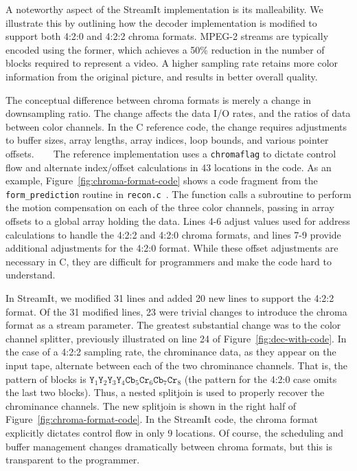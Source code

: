 \vspace{-8pt}A noteworthy aspect of the StreamIt implementation is its
malleability. We illustrate this by outlining how the decoder
implementation is modified to support both 4:2:0 and 4:2:2 chroma
formats. MPEG-2 streams are typically encoded using the former, which
achieves a 50\% reduction in the number of blocks required to
represent a video. A higher sampling rate retains more color
information from the original picture, and results in better overall
quality.

The conceptual difference between chroma formats is merely a change in
downsampling ratio. The change affects the data I/O rates, and the
ratios of data between color channels. In the C reference code, the
change requires adjustments to buffer sizes, array lengths, array
indices, loop bounds, and various pointer offsets.~~~~The reference implementation
uses a \texttt{chroma}{\newpage\noindent}\texttt{flag} to dictate control flow and alternate
index/offset calculations in 43 locations in the code. As an example,
Figure~\ref{fig:chroma-format-code} shows a code fragment from the
\texttt{form\_prediction} routine in
\texttt{recon.c}~\cite{reference-mpeg-c}. The function calls a
subroutine to perform the motion compensation on each of the three
color channels, passing in array offsets to a global array holding the
data. Lines 4-6 adjust values used for address calculations to handle
the 4:2:2 and 4:2:0 chroma formats, and lines 7-9 provide additional
adjustments for the 4:2:0 format. While these offset adjustments are
necessary in C, they are difficult for programmers and make the code
hard to understand.

In StreamIt, we modified 31 lines and added 20 new lines to support
the 4:2:2 format. Of the 31 modified lines, 23 were trivial changes to
introduce the chroma format as a stream parameter. The greatest
substantial change was to the color channel splitter, previously
illustrated on line 24 of Figure~\ref{fig:dec-with-code}. In the case
of a 4:2:2 sampling rate, the chrominance data, as they appear on the
input tape, alternate between each of the two chrominance
channels. That is, the pattern of blocks is $\texttt{Y}_1 \texttt{Y}_2
\texttt{Y}_3 \texttt{Y}_4 \texttt{Cb}_5 \texttt{Cr}_6 \texttt{Cb}_7
\texttt{Cr}_8$ (the pattern for the 4:2:0 case omits the last two
blocks). Thus, a nested splitjoin is used to properly recover the
chrominance channels. The new splitjoin is shown in the right half of
Figure~\ref{fig:chroma-format-code}.  In the StreamIt code, the chroma
format explicitly dictates control flow in only 9 locations. Of
course, the scheduling and buffer management changes dramatically
between chroma formats, but this is transparent to the programmer.

